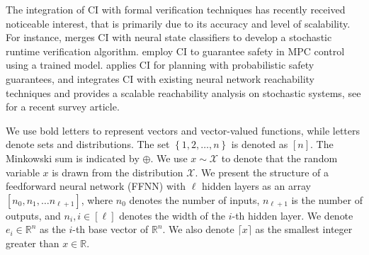  The integration of CI with formal verification techniques has recently received noticeable interest, that is primarily due to its accuracy and level of scalability. For instance, 
\cite{bortolussi2019neural} merges CI with neural state classifiers to develop a stochastic runtime verification algorithm. \cite{lindemann2023safe,zecchin2024forking} employ CI to guarantee safety in MPC control using a trained model. \cite{tonkens2023scalable}  applies CI for planning with probabilistic safety guarantees, and \cite{hashemi2024statistical} integrates CI with existing neural network reachability techniques and provides a scalable reachability analysis on stochastic systems, see \cite{lindemann2024formal} for a recent survey article.

 We use bold letters to represent vectors and vector-valued functions, while  letters  denote sets and distributions. The set $\left\{1,2,\ldots, n \right\}$ is denoted as $[n]$. The Minkowski sum is indicated by $\oplus$. We use $x \sim \mathcal{X}$ to denote that the random variable $x$ is drawn from the distribution $\mathcal{X}$. We present the structure of a feedforward neural network (FFNN) with $\ell$  hidden layers as  an array $[n_0,n_1,\ldots n_{\ell+1}]$, where $n_0$ denotes the number of inputs, $n_{\ell+1}$  is the number of outputs, and $n_i , i\in [\ell]$ denotes the width of the $i$-th hidden layer. We denote $e_i\in\mathbb{R}^n$ as the $i$-th base vector of $\mathbb{R}^n$. We also denote $\lceil x \rceil$ as the smallest integer greater than $x \in \mathbb{R}$.